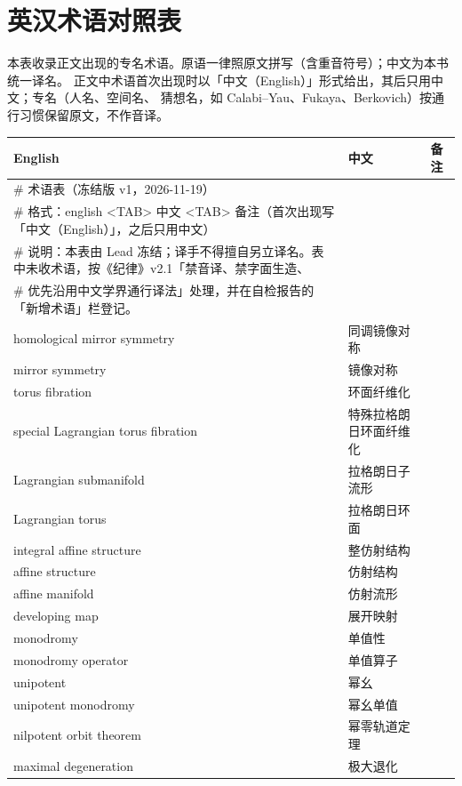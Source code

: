 \section{英汉术语对照表}

本表收录正文出现的专名术语。原语一律照原文拼写（含重音符号）；中文为本书统一译名。
正文中术语首次出现时以「中文（English）」形式给出，其后只用中文；专名（人名、空间名、
猜想名，如 Calabi--Yau、Fukaya、Berkovich）按通行习惯保留原文，不作音译。

\begingroup
\small
\begin{longtable}{@{}p{}p{}p{}@{}}
\toprule
\textbf{English} & \textbf{中文} & \textbf{备注} \\
\midrule
\endhead
\bottomrule
\endfoot
\# 术语表（冻结版 v1，2026-11-19） &  &  \\
\# 格式：english <TAB> 中文 <TAB> 备注（首次出现写「中文（English）」，之后只用中文） &  &  \\
\# 说明：本表由 Lead 冻结；译手不得擅自另立译名。表中未收术语，按《纪律》v2.1「禁音译、禁字面生造、 &  &  \\
\#       优先沿用中文学界通行译法」处理，并在自检报告的「新增术语」栏登记。 &  &  \\
homological mirror symmetry & 同调镜像对称 &  \\
mirror symmetry & 镜像对称 &  \\
torus fibration & 环面纤维化 &  \\
special Lagrangian torus fibration & 特殊拉格朗日环面纤维化 &  \\
Lagrangian submanifold & 拉格朗日子流形 &  \\
Lagrangian torus & 拉格朗日环面 &  \\
integral affine structure & 整仿射结构 &  \\
affine structure & 仿射结构 &  \\
affine manifold & 仿射流形 &  \\
developing map & 展开映射 &  \\
monodromy & 单值性 &  \\
monodromy operator & 单值算子 &  \\
unipotent & 幂幺 &  \\
unipotent monodromy & 幂幺单值 &  \\
nilpotent orbit theorem & 幂零轨道定理 &  \\
maximal degeneration & 极大退化 &  \\

\end{longtable}
